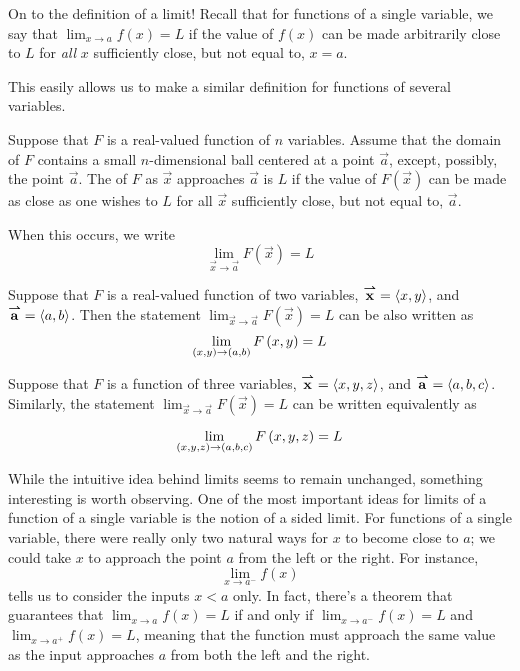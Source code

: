 \documentclass{ximera}
\begin{document}
On to the definition of a limit!
Recall that for functions of a single variable, we say that $\lim_{x\to a} f(x) = L$ if the value of $f(x)$ can be made arbitrarily close to $L$ for \emph{all} $x$ sufficiently close, but not equal to, $x=a$.

This easily allows us to make a similar definition for functions of several variables.

\begin{definition}
 Suppose that $F$ is a real-valued function of $n$ variables. Assume that the domain of $F$ contains a small $n$-dimensional ball centered at a point $\vec{a}$, except, possibly, the point $\vec{a}$.
  The  of $F$ as $\vec{x}$ approaches $\vec{a}$ is $L$ if the value of $F(\vec{x})$ can be made as close as one wishes to $L$ for all $\vec{x}$ sufficiently close, but not equal to, $\vec{a}$.
 
 When this occurs, we write 
 \[
 \lim_{\vec{x}\to \vec{a}} F(\vec{x}) = L
 \]  
\end{definition}

 \begin{remark}   
  Suppose that $F$ is a real-valued function of two variables, ${\overset{\boldsymbol{\rightharpoonup}}{\mathbf{x}}}\hspace{0in} = \left\langle x,y\right\rangle$, and ${\overset{\boldsymbol{\rightharpoonup}}{\mathbf{a}}}\hspace{0in} =
  \left\langle a,b\right\rangle$. 
  Then the statement $ \lim_{\vec{x}\to \vec{a}} F(\vec{x}) = L$ can be also written as
    \[
    \lim_{\left(x,y\right)\to \left(a,b\right) }F\left(x,y\right) = L
    \]
\end{remark}
  \begin{remark}
    Suppose that $F$ is a function of three variables, ${\overset{\boldsymbol{\rightharpoonup}}{\mathbf{x}}}\hspace{0in} = \left\langle x,y,z\right\rangle$, and
    ${\overset{\boldsymbol{\rightharpoonup}}{\mathbf{a}}}\hspace{0in} = \left\langle a,b,c\right\rangle$. Similarly, the statement 
    $ \lim_{\vec{x}\to \vec{a}} F(\vec{x}) = L$ can be written equivalently as

      \[
      \lim_{\left(x,y,z\right)\to \left(a,b,c\right)} F\left(x,y,z\right) = L
      \]


\end{remark}

While the intuitive idea behind limits seems to remain unchanged, something interesting is worth observing.  One of the most important ideas for limits of a function of a single variable is the notion of a sided limit.  For functions of a single variable, there were really only two natural ways for $x$ to become close to $a$; we could take $x$ to approach the point $a$ from the left or the right.  For instance,
\[
\lim_{x\to a^-}f(x) 
\]
tells us to consider the inputs $x<a$ only.  In fact, there's a theorem that guarantees that $\lim_{x\to a} f(x) = L$ if and only if $\lim_{x\to a^-}f(x) =L$ and $\lim_{x\to a^+}f(x) =L$, meaning that the function must approach the same value as the input approaches $a$ from both the left and the right.
\end{document}
